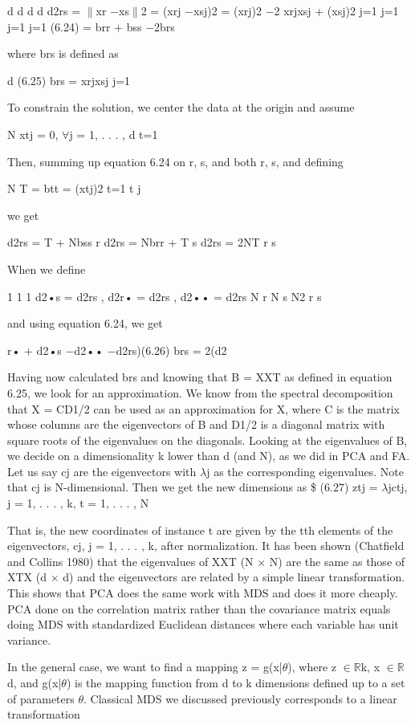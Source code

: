 d d d d d2rs = $\parallel$xr $-$xs$\parallel$2 = (xrj $-$xsj)2 = (xrj)2 $-$2 xrjxsj + (xsj)2 j=1 j=1 j=1 j=1 (6.24) = brr + bss $-$2brs

where brs is defined as

d (6.25) brs = xrjxsj j=1

To constrain the solution, we center the data at the origin and assume

N xtj = 0, $\forall$j = 1, . . . , d t=1

Then, summing up equation 6.24 on r, s, and both r, s, and defining

N T = btt = (xtj)2 t=1 t j

we get

d2rs = T + Nbss r d2rs = Nbrr + T s d2rs = 2NT r s

When we define

1 1 1 d2•s = d2rs , d2r• = d2rs , d2•• = d2rs N r N s N2 r s

and using equation 6.24, we get

r• + d2•s $-$d2•• $-$d2rs)(6.26) brs = 2(d2

Having now calculated brs and knowing that B = XXT as defined in equation 6.25, we look for an approximation. We know from the spectral decomposition that X = CD1/2 can be used as an approximation for X, where C is the matrix whose columns are the eigenvectors of B and D1/2 is a diagonal matrix with square roots of the eigenvalues on the diagonals. Looking at the eigenvalues of B, we decide on a dimensionality k lower than d (and N), as we did in PCA and FA. Let us say cj are the eigenvectors with $\lambda$j as the corresponding eigenvalues. Note that cj is N-dimensional. Then we get the new dimensions as \$ (6.27) ztj = $\lambda$jctj, j = 1, . . . , k, t = 1, . . . , N

That is, the new coordinates of instance t are given by the tth elements of the eigenvectors, cj, j = 1, . . . , k, after normalization. It has been shown (Chatfield and Collins 1980) that the eigenvalues of XXT (N $\times$ N) are the same as those of XTX (d $\times$ d) and the eigenvectors are related by a simple linear transformation. This shows that PCA does the same work with MDS and does it more cheaply. PCA done on the correlation matrix rather than the covariance matrix equals doing MDS with standardized Euclidean distances where each variable has unit variance.

In the general case, we want to find a mapping z = g(x|$\theta$), where z $\in$$\mathbb{R}$k, x $\in$$\mathbb{R}$d, and g(x|$\theta$) is the mapping function from d to k dimensions defined up to a set of parameters $\theta$. Classical MDS we discussed previously corresponds to a linear transformation

